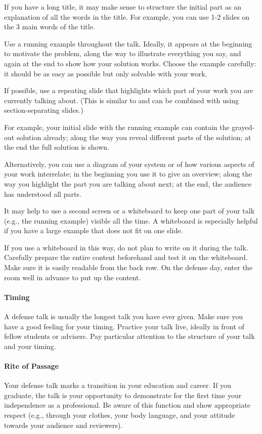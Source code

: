 \documentclass[12pt]{article}
\begin{document}
If you have a long title, it may make sense to structure the initial part as an explanation of all the words in the title.
For example, you can use 1-2 slides on the 3 main words of the title.
\medskip

Use a running example throughout the talk.
Ideally, it appears at the beginning to motivate the problem, along the way to illustrate everything you say, and again at the end to show how your solution works.
Choose the example carefully: it should be as easy as possible but only solvable with your work.
\medskip

If possible, use a repeating slide that highlights which part of your work you are currently talking about.
(This is similar to and can be combined with using section-separating slides.)

For example, your initial slide with the running example can contain the grayed-out solution already; along the way you reveal different parts of the solution; at the end the full solution is shown.

Alternatively, you can use a diagram of your system or of how various aspects of your work interrelate; in the beginning you use it to give an overview; along the way you highlight the part you are talking about next; at the end, the audience has understood all parts.
\medskip

It may help to use a second screen or a whiteboard to keep one part of your talk (e.g., the running example) visible all the time.
A whiteboard is especially helpful if you have a large example that does not fit on one slide.

If you use a whiteboard in this way, do not plan to write on it during the talk.
Carefully prepare the entire content beforehand and test it on the whiteboard. Make sure it is easily readable from the back row.
On the defense day, enter the room well in advance to put up the content.

\paragraph{Timing}
A defense talk is usually the longest talk you have ever given.
Make sure you have a good feeling for your timing.
Practice your talk live, ideally in front of fellow students or advisers.
Pay particular attention to the structure of your talk and your timing.

\paragraph{Rite of Passage}
Your defense talk marks a transition in your education and career.
If you graduate, the talk is your opportunity to demonstrate for the first time your independence as a professional.
Be aware of this function and show appropriate respect (e.g., through your clothes, your body language, and your attitude towards your audience and reviewers).
\medskip
\end{document}
